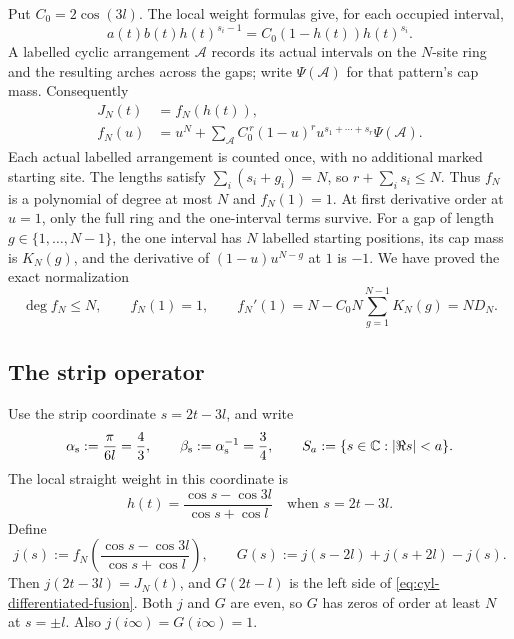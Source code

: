Put \(C_0=2\cos(3l)\).  The local weight formulas give, for each
occupied interval,
\[
 a(t)b(t)h(t)^{s_i-1}=C_0(1-h(t))h(t)^{s_i}.
\]
A labelled cyclic arrangement \(\mathcal A\) records its actual
intervals on the \(N\)-site ring and the resulting arches across the gaps;
write \(\Psi(\mathcal A)\) for that pattern's cap mass.  Consequently
\[
\begin{aligned}
 J_N(t)&=f_N(h(t)),\\
 f_N(u)&=u^N+
   \sum_{\mathcal A}
     C_0^{\,r}(1-u)^r u^{s_1+\cdots+s_r}\Psi(\mathcal A).
\end{aligned}
\]
Each actual labelled arrangement is counted once, with no additional
marked starting site.
The lengths satisfy \(\sum_i(s_i+g_i)=N\), so
\(r+\sum_i s_i\le N\).  Thus \(f_N\) is a polynomial of degree at
most \(N\) and \(f_N(1)=1\).  At first derivative order at \(u=1\),
only the full ring and the one-interval terms survive.  For a gap of
length \(g\in\{1,\ldots,N-1\}\), the one interval has \(N\) labelled
starting positions, its cap mass is \(K_N(g)\), and the derivative of
\((1-u)u^{N-g}\) at \(1\) is \(-1\).  We have proved the exact
normalization
\begin{equation}\label{eq:cyl-polynomial}
 \deg f_N\le N,\qquad
 f_N(1)=1,\qquad
 f_N'(1)=N-C_0N\sum_{g=1}^{N-1}K_N(g)=ND_N.
\end{equation}

\subsection{The strip operator}

Use the strip coordinate \(s=2t-3l\), and write
\[
 \alpha_{\rm s}:=\frac{\pi}{6l}=\frac43,\qquad
 \beta_{\rm s}:=\alpha_{\rm s}^{-1}=\frac34,\qquad
 S_a:=\{s\in\mathbb C:|\Re s|<a\}.
\]
The local straight weight in this coordinate is
\[
 h(t)=\frac{\cos s-\cos3l}{\cos s+\cos l}
 \quad\text{when }s=2t-3l.
\]
Define
\[
 j(s):=f_N\left(\frac{\cos s-\cos3l}{\cos s+\cos l}\right),
 \qquad
 G(s):=j(s-2l)+j(s+2l)-j(s).
\]
Then \(j(2t-3l)=J_N(t)\), and
\(G(2t-l)\) is the left side of
\eqref{eq:cyl-differentiated-fusion}.  Both \(j\) and \(G\) are even,
so \(G\) has zeros of order at least \(N\) at \(s=\pm l\).
Also \(j(i\infty)=G(i\infty)=1\).

